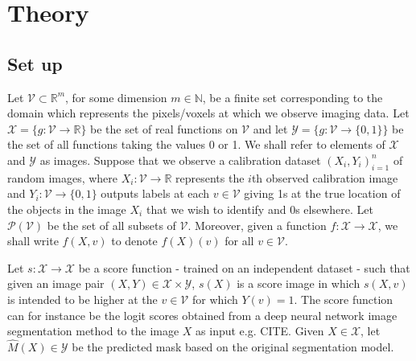 \section{Theory}
\subsection{Set up}
Let $\mathcal{V} \subset \mathbb{R}^m$, for some dimension $m \in \mathbb{N}$, be a finite set corresponding to the domain which represents the pixels/voxels at which we observe imaging data. Let $\mathcal{X} = \lbrace g: \mathcal{V} \rightarrow \mathbb{R}\rbrace$ be the set of real functions on $\mathcal{V}$ and let $\mathcal{Y} = \lbrace g: \mathcal{V} \rightarrow \lbrace 0,1 \rbrace \rbrace$ be the set of all functions taking the values 0 or 1. We shall refer to elements of $\mathcal{X}$ and $\mathcal{Y}$ as images. Suppose that we observe a calibration dataset $(X_i, Y_i)_{i = 1}^n$ of random images, where $X_i: \mathcal{V} \rightarrow \mathbb{R}$ represents the $i$th observed calibration image and $Y_i:\mathcal{V} \rightarrow \lbrace 0, 1\rbrace$ outputs labels at each $v \in \mathcal{V}$ giving 1s at the true location of the objects in the image $X_i$ that we wish to identify and 0s elsewhere. Let $\mathcal{P}(\mathcal{V})$ be the set of all subsets of $\mathcal{V}$. Moreover, given a function $f:\mathcal{X} \rightarrow \mathcal{X}$, we shall write $f(X,v)$ to denote $f(X)(v)$ for all $v \in \mathcal{V}$. 

Let $s:\mathcal{X}  \rightarrow \mathcal{X} $ be a score function - trained on an independent dataset - such that given an image pair $(X,Y) \in \mathcal{X}\times \mathcal{Y}$, $s(X)$ is a score image in which $s(X,v) $ is intended to be higher at the $v \in \mathcal{V}$ for which $Y(v) = 1$. The score function can for instance be the logit scores obtained from a deep neural network image segmentation method to the image $X$ as input e.g. CITE. Given $X \in \mathcal{X}$, let $\hat{M}(X) \in \mathcal{Y}$ be the predicted mask based on the original segmentation model.

